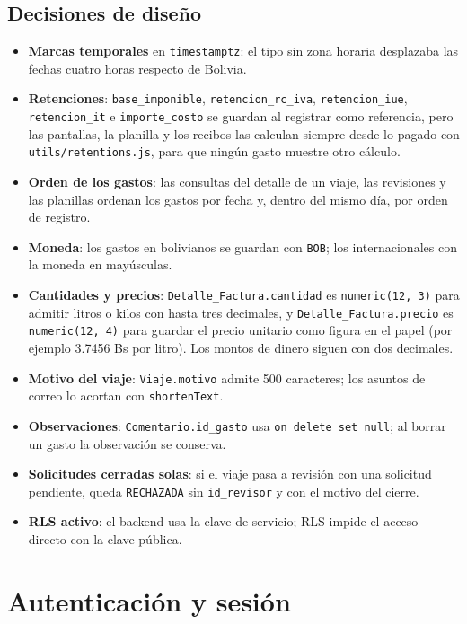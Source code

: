 \documentclass[11pt,letterpaper]{article}
\newcommand{\code}[1]{\nolinkurl{#1}}
\begin{document}
\subsection{Decisiones de diseño}
\begin{itemize}
  \item \textbf{Marcas temporales} en \code{timestamptz}: el tipo sin zona horaria desplazaba las fechas cuatro horas respecto de Bolivia.
  \item \textbf{Retenciones}: \code{base_imponible}, \code{retencion_rc_iva}, \code{retencion_iue}, \code{retencion_it} e \code{importe_costo} se guardan al registrar como referencia, pero las pantallas, la planilla y los recibos las calculan siempre desde lo pagado con \code{utils/retentions.js}, para que ningún gasto muestre otro cálculo.
  \item \textbf{Orden de los gastos}: las consultas del detalle de un viaje, las revisiones y las planillas ordenan los gastos por fecha y, dentro del mismo día, por orden de registro.
  \item \textbf{Moneda}: los gastos en bolivianos se guardan con \code{BOB}; los internacionales con la moneda en mayúsculas.
  \item \textbf{Cantidades y precios}: \code{Detalle_Factura.cantidad} es \code{numeric(12, 3)} para admitir litros o kilos con hasta tres decimales, y \code{Detalle_Factura.precio} es \code{numeric(12, 4)} para guardar el precio unitario como figura en el papel (por ejemplo 3.7456 Bs por litro). Los montos de dinero siguen con dos decimales.
  \item \textbf{Motivo del viaje}: \code{Viaje.motivo} admite 500 caracteres; los asuntos de correo lo acortan con \code{shortenText}.
  \item \textbf{Observaciones}: \code{Comentario.id_gasto} usa \code{on delete set null}; al borrar un gasto la observación se conserva.
  \item \textbf{Solicitudes cerradas solas}: si el viaje pasa a revisión con una solicitud pendiente, queda \code{RECHAZADA} sin \code{id_revisor} y con el motivo del cierre.
  \item \textbf{RLS activo}: el backend usa la clave de servicio; RLS impide el acceso directo con la clave pública.
\end{itemize}

\section{Autenticación y sesión}
\end{document}
